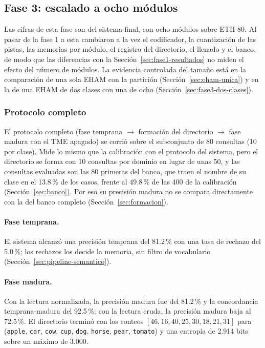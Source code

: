 \subsection{Fase 3: escalado a ocho módulos}
\label{sec:fase3-resultados}

Las cifras de esta fase son del sistema final, con ocho módulos sobre ETH-80.
Al pasar de la fase 1 a esta cambiaron a la vez el codificador, la cuantización de las
pistas, las memorias por módulo, el registro del directorio, el llenado y el banco, de
modo que las diferencias con la Sección~\ref{sec:fase1-resultados} no miden el efecto
del número de módulos.
La evidencia controlada del tamaño está en la comparación de una sola EHAM con la
partición (Sección~\ref{sec:eham-unica}) y en la de una EHAM de dos clases con una de
ocho (Sección~\ref{sec:fase3-dos-clases}).

\subsubsection{Protocolo completo}
\label{sec:proto-completo}

El protocolo completo (fase temprana $\to$ formación del directorio $\to$ fase madura
con el TME apagado) se corrió sobre el subconjunto de 80 consultas (10 por clase).
Mide lo mismo que la calibración con el protocolo del sistema, pero el directorio se
forma con 10 consultas por dominio en lugar de unas 50, y las consultas evaluadas son
las 80 primeras del banco, que traen el nombre de su clase en el 13.8\,\% de los casos,
frente al 49.8\,\% de las 400 de la calibración (Sección~\ref{sec:banco}).
Por eso su precisión madura no se compara directamente con la del banco completo
(Sección~\ref{sec:formacion}).

\paragraph{Fase temprana.}
El sistema alcanzó una precisión temprana del 81.2\,\% con una tasa de rechazo del 5.0\,\%;
los rechazos los decide la memoria, sin filtro de vocabulario
(Sección~\ref{sec:pipeline-semantico}).

\paragraph{Fase madura.}
Con la lectura normalizada, la precisión madura fue del 81.2\,\% y la concordancia
temprana-madura del 92.5\,\%; con la lectura cruda, la precisión madura baja al 72.5\,\%.
El directorio terminó con los conteos $[46, 16, 40, 25, 30, 18, 21, 31]$ para
(\texttt{apple}, \texttt{car}, \texttt{cow}, \texttt{cup}, \texttt{dog}, \texttt{horse},
\texttt{pear}, \texttt{tomato}) y una entropía de 2.914 bits sobre un máximo de 3.000.

